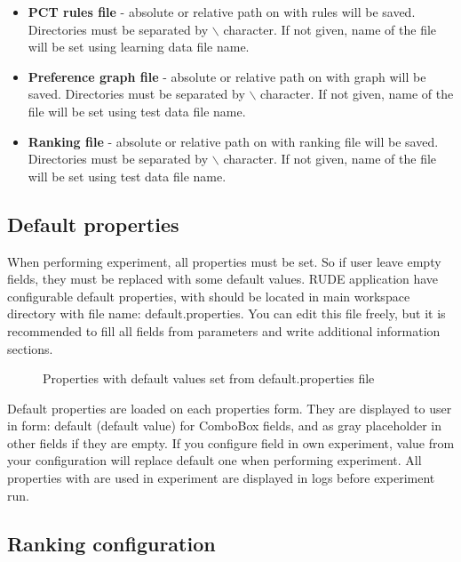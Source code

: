 \begin{itemize}
	\item \textbf{PCT rules file} - absolute or relative path on with rules will be saved. Directories must be separated by $\backslash$ character. If not given, name of the file will be set using learning data file name.
	\item \textbf{Preference graph file} - absolute or relative path on with graph will be saved. Directories must be separated by $\backslash$ character. If not given, name of the file will be set using test data file name.
	\item \textbf{Ranking file} - absolute or relative path on with ranking file will be saved. Directories must be separated by $\backslash$ character. If not given, name of the file will be set using test data file name.
\end{itemize}

\subsection{Default properties}\label{sub:properties-default}

When performing experiment, all properties must be set. So if user leave empty fields, they must be replaced with some default values. RUDE application have configurable default properties, with should be located in main workspace directory with file name: default.properties. You can edit this file freely, but it is recommended to fill all fields from parameters and write additional information sections.

\begin{figure*}[!ht] 
	\centering
	\caption{Properties with default values set from default.properties file}
\end{figure*}

Default properties are loaded on each properties form. They are displayed to user in form: default (default value) for ComboBox fields, and as gray placeholder in other fields if they are empty. If you configure field in own experiment, value from your configuration will replace default one when performing experiment. All properties with are used in experiment are displayed in logs before experiment run.


\subsection{Ranking configuration}\label{sub:properties-ranking}

